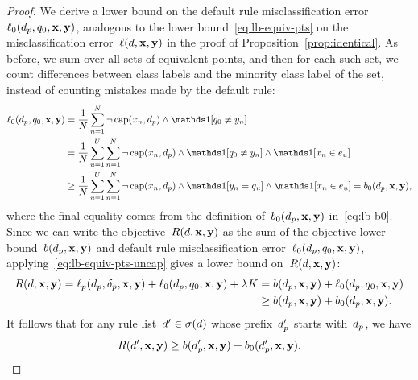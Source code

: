 \begin{arxiv}
\begin{proof}
We derive a lower bound on the default rule
misclassification error~$\ell_0(d_p, q_0, \mathbf{x}, \mathbf{y})$,
analogous to the lower bound~\eqref{eq:lb-equiv-pts} on the misclassification
error~$\ell({d}, \mathbf{x}, \mathbf{y})$ in the proof of Proposition~\ref{prop:identical}.
%
As before, we sum over all sets of equivalent points, and then for each such set,
we count differences between class labels and the minority class label of the set,
instead of counting mistakes made by the default rule:
\begin{align}
\Loss_0(\Prefix, \Default, \x, \y)
&= \frac{1}{N} \sum_{n=1}^N \neg\, \Cap(x_n, \Prefix) \wedge \one [ q_0 \neq y_n ] \nn \\
&= \frac{1}{N} \sum_{u=1}^U \sum_{n=1}^N \neg\, \Cap(x_n, \Prefix) \wedge \one [ q_0 \neq y_n ]
  \wedge \one [ x_n \in e_u ] \nn \\
&\ge \frac{1}{N} \sum_{u=1}^U \sum_{n=1}^N \neg\, \Cap(x_n, \Prefix) \wedge \one [ y_n = q_u ]
  \wedge \one [ x_n \in e_u ] = b_0(\Prefix, \x, \y),
\label{eq:lb-equiv-pts-uncap}
\end{align}
where the final equality comes from the definition of~$b_0(d_p, \mathbf{x}, \mathbf{y})$ in~\eqref{eq:lb-b0}.
%
Since we can write the objective~$R({d}, \mathbf{x}, \mathbf{y})$
as the sum of the objective lower bound~$b(d_p, \mathbf{x}, \mathbf{y})$ and
default rule misclassification error~$\ell_0(d_p, q_0, \mathbf{x}, \mathbf{y})$,
applying~\eqref{eq:lb-equiv-pts-uncap} gives a lower bound on~$R({d}, \mathbf{x}, \mathbf{y})$:
\begin{align}
R({d}, \mathbf{x}, \mathbf{y})
= \ell_p(d_p, \delta_p, \mathbf{x}, \mathbf{y}) + \ell_0(d_p, q_0, \mathbf{x}, \mathbf{y}) + {\lambda} K
&= b(d_p, \mathbf{x}, \mathbf{y}) + \ell_0(d_p, q_0, \mathbf{x}, \mathbf{y}) \nonumber \\
&\ge b(d_p, \mathbf{x}, \mathbf{y}) + b_0(d_p, \mathbf{x}, \mathbf{y}).
\label{eq:equiv-pts-base}
\end{align}
It follows that for any rule list~${{d}' \in \sigma({d})}$ whose prefix~$d_p'$
starts with~$d_p$, we have
\begin{align}
R({d}', \mathbf{x}, \mathbf{y}) \ge b(d_p', \mathbf{x}, \mathbf{y}) + b_0(d_p', \mathbf{x}, \mathbf{y}).
\label{eq:equiv-pts-extend}
\end{align}


\end{proof}
\end{arxiv}
